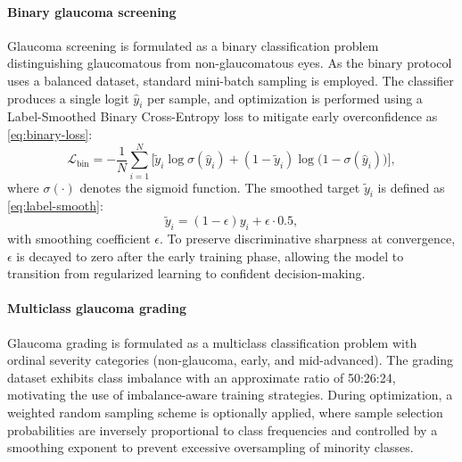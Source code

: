 \documentclass[preprint,12pt]{elsarticle}
\newcommand{\eqrefp}[1]{\eqref{#1}}
\begin{document}
\paragraph{Binary glaucoma screening}
Glaucoma screening is formulated as a binary classification problem distinguishing glaucomatous from non-glaucomatous eyes. As the binary protocol uses a balanced dataset, standard mini-batch sampling is employed. The classifier produces a single logit $\hat{y}_i$ per sample, and optimization is performed using a Label-Smoothed Binary Cross-Entropy loss to mitigate early overconfidence as \eqrefp{eq:binary-loss}:
\begin{equation}
    \mathcal{L}_{\text{bin}} =
    -\frac{1}{N}\sum_{i=1}^{N}
    \Big[
        \tilde{y}_i \log \sigma(\hat{y}_i)
        +
        (1-\tilde{y}_i)\log \bigl(1-\sigma(\hat{y}_i)\bigr)
        \Big],
    \label{eq:binary-loss}
\end{equation}
where $\sigma(\cdot)$ denotes the sigmoid function. The smoothed target $\tilde{y}_i$ is defined as \eqrefp{eq:label-smooth}:
\begin{equation}
    \tilde{y}_i = (1-\epsilon)y_i + \epsilon \cdot 0.5,
    \label{eq:label-smooth}
\end{equation}
with smoothing coefficient $\epsilon$. To preserve discriminative sharpness at convergence, $\epsilon$ is decayed to zero after the early training phase, allowing the model to transition from regularized learning to confident decision-making.


\paragraph{Multiclass glaucoma grading}
Glaucoma grading is formulated as a multiclass classification problem with ordinal severity categories (non-glaucoma, early, and mid-advanced). The grading dataset exhibits class imbalance with an approximate ratio of 50:26:24, motivating the use of imbalance-aware training strategies. During optimization, a weighted random sampling scheme is optionally applied, where sample selection probabilities are inversely proportional to class frequencies and controlled by a smoothing exponent to prevent excessive oversampling of minority classes.
\end{document}
